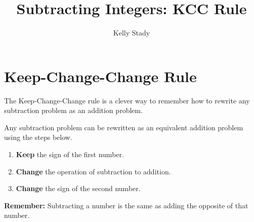 \documentclass{ximera}[font=12pt]
\title{Subtracting Integers: KCC Rule}   %
\author{Kelly Stady}
\begin{document}
\begin{abstract}

\end{abstract}

\maketitle
\label{xim:SubtractIntKCCActivity}

\section*{Keep-Change-Change Rule}

The Keep-Change-Change rule is a clever way to remember how to rewrite any subtraction problem as an addition problem.

\begin{procedure}

Any subtraction problem can be rewritten as an equivalent addition problem using the steps below.

\begin{enumerate}
\item \textbf{Keep} the sign of the first number.

\item \textbf{Change} the operation of subtraction to addition.

\item \textbf{Change} the sign of the second number.

\end{enumerate}

\textcolor{orange!70!black}{\textbf{Remember:}}  Subtracting a number is the same as adding the opposite of that number.
\end{procedure}
\end{document}
